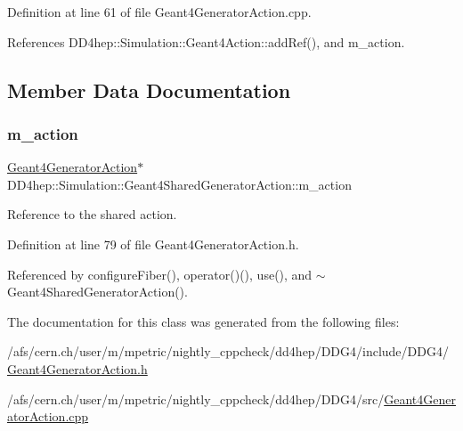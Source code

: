 Definition at line 61 of file Geant4\+Generator\+Action.\+cpp.



References D\+D4hep\+::\+Simulation\+::\+Geant4\+Action\+::add\+Ref(), and m\+\_\+action.



\subsection{Member Data Documentation}
\hypertarget{class_d_d4hep_1_1_simulation_1_1_geant4_shared_generator_action_ac161fab3e1f99c7dc5a8555bacb904a2}{}\label{class_d_d4hep_1_1_simulation_1_1_geant4_shared_generator_action_ac161fab3e1f99c7dc5a8555bacb904a2} 
\subsubsection{\texorpdfstring{m\+\_\+action}{m\_action}}
{\footnotesize\ttfamily \hyperlink{class_d_d4hep_1_1_simulation_1_1_geant4_generator_action}{Geant4\+Generator\+Action}$\ast$ D\+D4hep\+::\+Simulation\+::\+Geant4\+Shared\+Generator\+Action\+::m\+\_\+action\hspace{0.3cm}{\ttfamily [protected]}}



Reference to the shared action. 



Definition at line 79 of file Geant4\+Generator\+Action.\+h.



Referenced by configure\+Fiber(), operator()(), use(), and $\sim$\+Geant4\+Shared\+Generator\+Action().



The documentation for this class was generated from the following files\+:\begin{DoxyCompactItemize}
\item 
/afs/cern.\+ch/user/m/mpetric/nightly\+\_\+cppcheck/dd4hep/\+D\+D\+G4/include/\+D\+D\+G4/\hyperlink{_geant4_generator_action_8h}{Geant4\+Generator\+Action.\+h}\item 
/afs/cern.\+ch/user/m/mpetric/nightly\+\_\+cppcheck/dd4hep/\+D\+D\+G4/src/\hyperlink{_geant4_generator_action_8cpp}{Geant4\+Generator\+Action.\+cpp}\end{DoxyCompactItemize}
